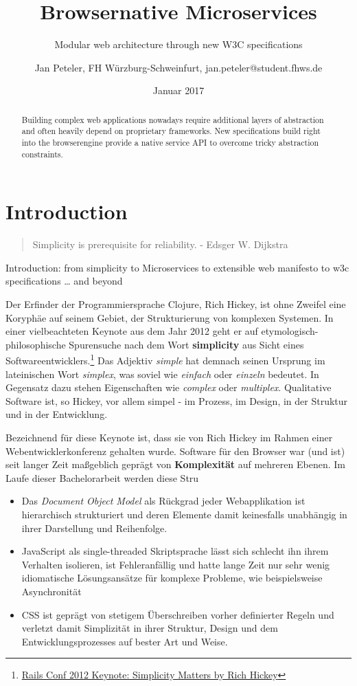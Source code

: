 \documentclass[]{assets/latex/ieee}
\title{Browsernative Microservices}
\subtitle{Modular web architecture through new W3C specifications}
\author{Jan Peteler, FH Würzburg-Schweinfurt, jan.peteler@student.fhws.de}
\date{Januar 2017}
\providecommand{\tightlist}{%
  \setlength{\itemsep}{0pt}\setlength{\parskip}{0pt}}
\begin{document}
\maketitle
\begin{abstract}
Building complex web applications nowadays require additional layers of
abstraction and often heavily depend on proprietary frameworks. New
specifications build right into the browserengine provide a native
service API to overcome tricky abstraction constraints.
\end{abstract}

\section{Introduction}\label{introduction}

\begin{quote}
Simplicity is prerequisite for reliability. - Edsger W. Dijkstra
\end{quote}

Introduction: from simplicity to Microservices to extensible web
manifesto to w3c specifications \ldots{} and beyond

Der Erfinder der Programmiersprache Clojure, Rich Hickey, ist ohne
Zweifel eine Koryphäe auf seinem Gebiet, der Strukturierung von
komplexen Systemen. In einer vielbeachteten Keynote aus dem Jahr 2012
geht er auf etymologisch-philosophische Spurensuche nach dem Wort
\textbf{simplicity } aus Sicht eines Softwareentwicklers.\footnote{\href{https://www.youtube.com/watch?v=rI8tNMsozo0\&t=48s}{Rails
  Conf 2012 Keynote: Simplicity Matters by Rich Hickey}} Das Adjektiv
\emph{simple} hat demnach seinen Ursprung im lateinischen Wort
\emph{simplex}, was soviel wie \emph{einfach} oder \emph{einzeln}
bedeutet. In Gegensatz dazu stehen Eigenschaften wie \emph{complex} oder
\emph{multiplex}. Qualitative Software ist, so Hickey, vor allem simpel
- im Prozess, im Design, in der Struktur und in der Entwicklung.

Bezeichnend für diese Keynote ist, dass sie von Rich Hickey im Rahmen
einer Webentwicklerkonferenz gehalten wurde. Software für den Browser
war (und ist) seit langer Zeit maßgeblich geprägt von
\textbf{Komplexität} auf mehreren Ebenen. Im Laufe dieser Bachelorarbeit
werden diese Stru

\begin{itemize}
\tightlist
\item
  Das \emph{Document Object Model} als Rückgrad jeder Webapplikation ist
  hierarchisch strukturiert und deren Elemente damit keinesfalls
  unabhängig in ihrer Darstellung und Reihenfolge.
\item
  JavaScript als single-threaded Skriptsprache lässt sich schlecht ihn
  ihrem Verhalten isolieren, ist Fehleranfällig und hatte lange Zeit nur
  sehr wenig idiomatische Lösungsansätze für komplexe Probleme, wie
  beispielsweise Asynchronität
\item
  CSS ist geprägt von stetigem Überschreiben vorher definierter Regeln
  und verletzt damit Simplizität in ihrer Struktur, Design und dem
  Entwicklungsprozesses auf bester Art und Weise.
\end{itemize}
\end{document}
